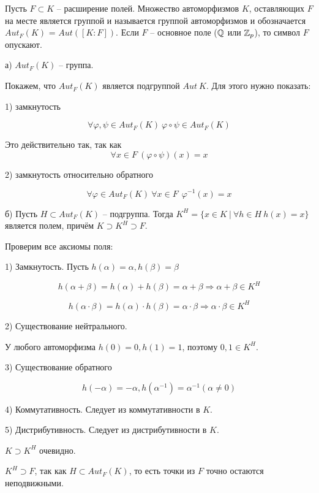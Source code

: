 Пусть $F \subset K$ -- расширение полей. 
Множество автоморфизмов $K$, оставляющих $F$ на месте является группой и
называется группой автоморфизмов и обозначается 
$Aut_F (K)$ = $Aut([K : F])$. 
Если $F$ -- основное поле ($\mathbb{Q}$ или $\mathbb{Z}_p$), то символ $F$ опускают.

а) $Aut_F (K)$ -- группа.

Покажем, что $Aut_F (K)$ является подгруппой $Aut\ K$.
Для этого нужно показать:

1) замкнутость

$$
\forall \varphi, \psi \in Aut_F (K)\ \varphi \circ \psi \in Aut_F (K)
$$

Это действительно так, так как 
$$
\forall x \in F \ (\varphi \circ \psi)(x) = x
$$

2) замкнутость относительно обратного

$$
\forall \varphi \in Aut_F (K)\ \forall x \in F\ \ 
\varphi^{-1}(x) = x
$$

б) Пусть $H \subset Aut_F (K)$ -- подгруппа. 
Тогда $K^H = \{x \in K\ |\ \forall h \in H \ h(x) = x\}$ 
является полем, причём $K \supset K^H \supset F$.

Проверим все аксиомы поля:

1) Замкнутость. Пусть $h(\alpha) = \alpha, h(\beta) = \beta$

$$
h(\alpha + \beta) = h(\alpha) + h(\beta) = \alpha + \beta
\Rightarrow \alpha + \beta \in K^H
$$

$$
h(\alpha \cdot \beta) = h(\alpha) \cdot h(\beta) = \alpha \cdot \beta
\Rightarrow \alpha \cdot \beta \in K^H
$$

2) Существование нейтрального. 

У любого автоморфизма $h(0) = 0, h(1) = 1$, поэтому $0, 1 \in K^H$.

3) Существование обратного

$$
h(-\alpha) = -\alpha, h(\alpha^{-1}) = \alpha^{-1} (\alpha \neq 0)
$$

4) Коммутативность. Следует из коммутативности в $K$.

5) Дистрибутивность. Следует из дистрибутивности в $K$.

$K \supset K^H$ очевидно.

$K^H \supset F$, так как $H \subset Aut_F (K)$, то есть 
точки из $F$ точно остаются неподвижными.
